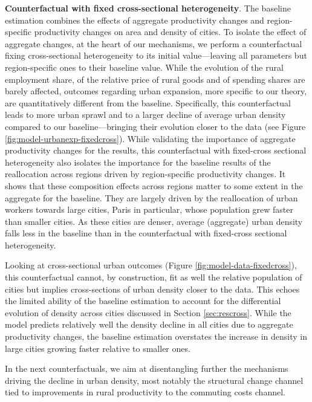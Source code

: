 \documentclass[./20250130-paper.tex]{subfiles}
\begin{document}
\textbf{Counterfactual with fixed cross-sectional heterogeneity}. The baseline estimation combines the effects of aggregate productivity changes and region-specific productivity changes on area and density of cities. To isolate the effect of aggregate changes, at the heart of our mechanisms, we perform a counterfactual fixing cross-sectional heterogeneity to its initial value---leaving all parameters but region-specific ones to their baseline value. While the evolution of the rural employment share, of the relative price of rural goods and of spending shares are barely affected, outcomes regarding urban expansion, more specific to our theory, are quantitatively different from the baseline. Specifically, this counterfactual leads to more urban sprawl and to a larger decline of average urban density compared to our baseline---bringing their evolution closer to the data (see Figure \ref{fig:model-urbanexp-fixedcross}). While validating the importance of aggregate productivity changes for the results, this counterfactual with fixed-cross sectional heterogeneity also isolates the importance for the baseline results of the reallocation across regions driven by region-specific productivity changes. It shows that these composition effects across regions matter to some extent in the aggregate for the baseline. They are largely driven by the reallocation of urban workers towards large cities, Paris in particular, whose population grew faster than smaller cities. As these cities are denser, average (aggregate) urban density falls less in the baseline than in the counterfactual with fixed-cross sectional heterogeneity. 



Looking at cross-sectional urban outcomes (Figure \ref{fig:model-data-fixedcross}), this counterfactual cannot, by construction, fit as well the relative population of cities but implies cross-sections of urban density closer to the data. This echoes the limited ability of the baseline estimation to account for the differential evolution of density across cities discussed in Section \ref{sec:rescross}. While the model predicts relatively well the density decline in all cities due to aggregate productivity changes, the baseline estimation overstates the increase in density in large cities growing faster relative to smaller ones. 





In the next counterfactuals, we aim at disentangling further the mechanisms driving the decline in urban density, most notably the structural change channel tied to improvements in rural productivity to the commuting costs channel.
\end{document}
